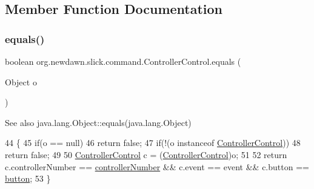 \subsection{Member Function Documentation}
\mbox{\label{classorg_1_1newdawn_1_1slick_1_1command_1_1_controller_control_acfe105999ec655c1e74ae103d439c9fd}} 
\subsubsection{\texorpdfstring{equals()}{equals()}}
{\footnotesize\ttfamily boolean org.\+newdawn.\+slick.\+command.\+Controller\+Control.\+equals (\begin{DoxyParamCaption}\item[{Object}]{o }\end{DoxyParamCaption})\hspace{0.3cm}{\ttfamily [inline]}}

\begin{DoxySeeAlso}{See also}
java.\+lang.\+Object\+::equals(java.\+lang.\+Object) 
\end{DoxySeeAlso}

\begin{DoxyCode}
44                                     \{
45         \textcolor{keywordflow}{if}(o == null)
46             \textcolor{keywordflow}{return} \textcolor{keyword}{false};
47         \textcolor{keywordflow}{if}(!(o instanceof \mbox{\hyperlink{classorg_1_1newdawn_1_1slick_1_1command_1_1_controller_control_adf8bbe383d714ea06a61632b6b7e250c}{ControllerControl}}))
48             \textcolor{keywordflow}{return} \textcolor{keyword}{false};
49         
50         \mbox{\hyperlink{classorg_1_1newdawn_1_1slick_1_1command_1_1_controller_control_adf8bbe383d714ea06a61632b6b7e250c}{ControllerControl}} c = (\mbox{\hyperlink{classorg_1_1newdawn_1_1slick_1_1command_1_1_controller_control_adf8bbe383d714ea06a61632b6b7e250c}{ControllerControl}})o;
51         
52         \textcolor{keywordflow}{return} c.controllerNumber == \mbox{\hyperlink{classorg_1_1newdawn_1_1slick_1_1command_1_1_controller_control_a4372c7c9a9aa160ea43f48dc27b1ad40}{controllerNumber}} && c.event == \textcolor{keyword}{event} && c.button == 
      \mbox{\hyperlink{classorg_1_1newdawn_1_1slick_1_1command_1_1_controller_control_ad8d48f8cc2889d5360de6dc2202203f4}{button}};
53     \}
\end{DoxyCode}
\mbox{\label{classorg_1_1newdawn_1_1slick_1_1command_1_1_controller_control_a39f49615766d263e781442f9b553694a}} 
